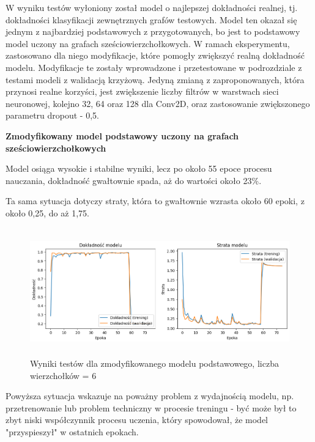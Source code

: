 W wyniku testów wyłoniony został model o najlepszej dokładności realnej, tj.
dokładności klasyfikacji zewnętrznych grafów testowych.
Model ten okazał się jednym z najbardziej podstawowych z przygotowanych,
bo jest to podstawowy model uczony na grafach sześciowierzchołkowych.
W ramach eksperymentu, zastosowano dla niego modyfikacje,
które pomogły zwiększyć realną dokładność modelu.
Modyfikacje te zostały wprowadzone i przetestowane w podrozdziale z testami modeli
z walidacją krzyżową.
Jedyną zmianą z zaproponowanych, która przynosi realne korzyści,
jest zwiększenie liczby filtrów w warstwach sieci neuronowej, kolejno 32, 64 oraz 128 dla Conv2D,
oraz zastosowanie zwiększonego parametru dropout - 0,5.

\textbf{Zmodyfikowany model podstawowy uczony na grafach sześciowierzchołkowych}

Model osiąga wysokie i stabilne wyniki, lecz po około 55 epoce procesu nauczania,
dokładność gwałtownie spada, aż do wartości około 23\%.

Ta sama sytuacja dotyczy straty, która to gwałtownie wzrasta około 60 epoki,
z około 0,25, do aż 1,75.

\begin{figure}[ht]
	\centering
	\includegraphics[height=5.5cm]{resources/tests/images/v4/base6_1_img.png}
	\caption{Wyniki testów dla zmodyfikowanego modelu podstawowego, liczba wierzchołków = 6}
	\label{Fig:tests-base-5a}
\end{figure}
\FloatBarrier

Powyższa sytuacja wskazuje na poważny problem z wydajnością modelu,
np. przetrenowanie lub problem techniczny w procesie treningu
- być może był to zbyt niski współczynnik procesu uczenia,
który spowodował, że model "przyspieszył" w ostatnich epokach.


